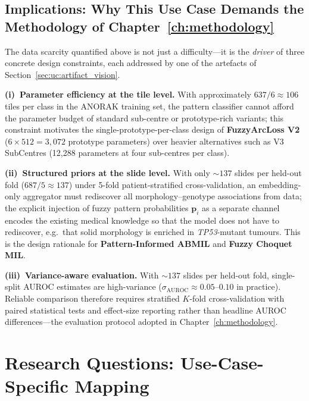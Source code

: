 \subsection{Implications: Why This Use Case Demands the Methodology of Chapter~\ref{ch:methodology}}
\label{sec:uc:data_scarcity:implications}

The data scarcity quantified above is not just a difficulty---it is
the \emph{driver} of three concrete design constraints, each
addressed by one of the artefacts of
Section~\ref{sec:uc:artifact_vision}.

\textbf{(i)~Parameter efficiency at the tile level.}
With approximately $637/6 \approx 106$ tiles per class in the ANORAK
training set, the pattern classifier cannot afford the parameter
budget of standard sub-centre or prototype-rich variants;
this constraint motivates the single-prototype-per-class design of
\textbf{FuzzyArcLoss V2} ($6 \times 512 = 3{,}072$ prototype
parameters) over heavier alternatives such as V3 SubCentres
(12{,}288 parameters at four sub-centres per class).

\textbf{(ii)~Structured priors at the slide level.}
With only $\sim 137$ slides per held-out fold
($687 / 5 \approx 137$) under 5-fold patient-stratified
cross-validation, an embedding-only aggregator must rediscover all
morphology--genotype associations from data;
the explicit injection of fuzzy pattern probabilities
$\mathbf{p}_i$ as a separate channel encodes the existing medical
knowledge so that the model does not have to rediscover, e.g.~that
solid morphology is enriched in \textit{TP53}-mutant tumours.
This is the design rationale for \textbf{Pattern-Informed ABMIL} and
\textbf{Fuzzy Choquet MIL}.

\textbf{(iii)~Variance-aware evaluation.}
With $\sim 137$ slides per held-out fold, single-split AUROC estimates are
high-variance ($\sigma_{\mathrm{AUROC}} \approx 0.05$--$0.10$ in
practice).
Reliable comparison therefore requires stratified $K$-fold
cross-validation with paired statistical tests and effect-size
reporting rather than headline AUROC differences---the evaluation
protocol adopted in Chapter~\ref{ch:methodology}.


\section{Research Questions: Use-Case-Specific Mapping}
\label{sec:uc:clinical_questions}


